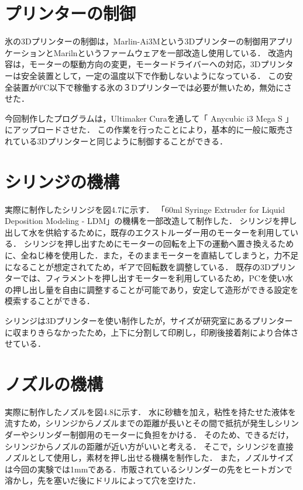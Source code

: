\section{プリンターの制御}
\label{sec:paragraph}
氷の3Dプリンターの制御は，Marlin-Ai3Mという3Dプリンターの制御用アプリケーションとMarilnというファームウェアを一部改造し使用している．
改造内容は，モーターの駆動方向の変更，モータードライバーへの対応，3Dプリンターは安全装置として，一定の温度以下で作動しないようになっている．
この安全装置が0℃以下で稼働する氷の３Dプリンターでは必要が無いため，無効にさせた．

今回制作したプログラムは，Ultimaker Curaを通して「 Anycubic i3 Mega S 」にアップロードさせた．
この作業を行ったことにより，基本的に一般に販売されている3Dプリンターと同じように制御することができる．

\section{シリンジの機構}
\label{sec:paragraph}
実際に制作したシリンジを図4.7に示す．
「60ml Syringe Extruder for Liquid Deposition Modeling - LDM」の機構を一部改造して制作した\cite{abc}．
シリンジを押し出して水を供給するために，既存のエクストルーダー用のモーターを利用している．
シリンジを押し出すためにモーターの回転を上下の運動へ置き換えるために、全ねじ棒を使用した．また，そのままモーターを直結してしまうと，力不足になることが想定されてため，ギアで回転数を調整している．
既存の3Dプリンターでは、フィラメントを押し出すモーターを利用しているため，PCを使い水の押し出し量を自由に調整することが可能であり，安定して造形ができる設定を模索することができる．

シリンジは3Dプリンターを使い制作したが，サイズが研究室にあるプリンターに収まりきらなかったため，上下に分割して印刷し，印刷後接着剤により合体させている．

\section{ノズルの機構}
\label{sec:paragraph}
実際に制作したノズルを図4.8に示す．
水に砂糖を加え，粘性を持たせた液体を流すため，シリンジからノズルまでの距離が長いとその間で抵抗が発生しシリンダーやシリンダー制御用のモーターに負担をかける．
そのため、できるだけ，シリンジからノズルの距離が近い方がいいと考える．
そこで，シリンジを直接ノズルとして使用し，素材を押し出せる機構を制作した．
また，ノズルサイズは今回の実験では1mmである．市販されているシリンダーの先をヒートガンで溶かし，先を塞いだ後にドリルによって穴を空けた．

